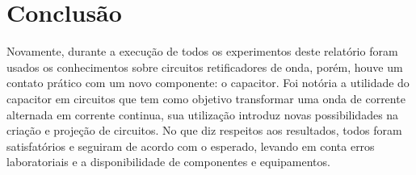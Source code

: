 \chapter{Conclus\~{a}o}
Novamente, durante a execução de todos os experimentos deste relatório foram usados os conhecimentos sobre circuitos retificadores de onda, porém, houve um contato prático com um novo componente: o capacitor.
Foi notória a utilidade do capacitor em circuitos que tem como objetivo transformar uma onda de corrente alternada em corrente continua, sua utilização introduz novas possibilidades na criação e projeção de circuitos.
No que diz respeitos aos resultados, todos foram satisfatórios e seguiram de acordo com o esperado, levando em conta erros laboratoriais e a disponibilidade de componentes e equipamentos. 
